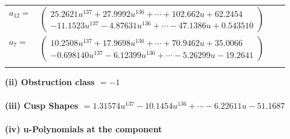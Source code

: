 \documentclass[1p]{elsarticle_modified}
\theoremstyle{definition}
\begin{document}
\begin{tabular}{m{7pt} m{180pt} m{7pt} m{180pt} }
\flushright $a_{12}=$&$\begin{pmatrix}25.2621 u^{137}+27.9992 u^{136}+\cdots+102.662 u+62.2454\\-11.1523 u^{137}-4.87631 u^{136}+\cdots-47.1386 u+0.543510\end{pmatrix}$ \\
\flushright $a_{7}=$&$\begin{pmatrix}10.2508 u^{137}+17.9698 u^{136}+\cdots+70.9462 u+35.0066\\-0.698140 u^{137}-6.12399 u^{136}+\cdots-5.26299 u-19.2641\end{pmatrix}$\\&\end{tabular}
\flushleft \textbf{(ii) Obstruction class $= -1$}\\~\\
\flushleft \textbf{(iii) Cusp Shapes $= 1.31574 u^{137}-10.1454 u^{136}+\cdots-6.22611 u-51.1687$}\\~\\
\newpage\renewcommand{\arraystretch}{1}
\flushleft \textbf{(iv) u-Polynomials at the component}\newline \\
\end{document}
